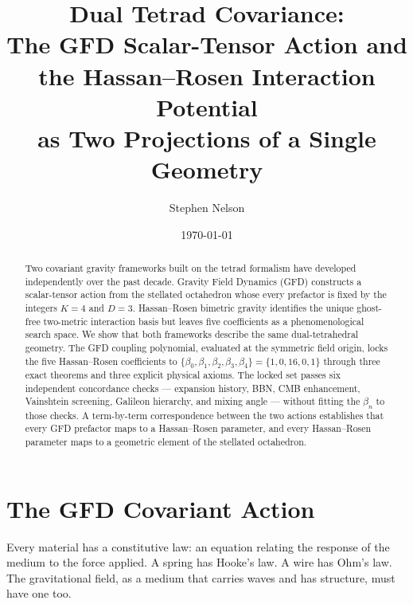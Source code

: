 \documentclass[twocolumn,showpacs,preprintnumbers,amsmath,amssymb,prd]{revtex4-2}
\begin{document}
\title{Dual Tetrad Covariance:\\The GFD Scalar-Tensor Action and the Hassan--Rosen Interaction Potential\\as Two Projections of a Single Geometry}

\author{Stephen Nelson}

\date{\today}

\begin{abstract}
Two covariant gravity frameworks built on the tetrad formalism have developed independently over the past decade. Gravity Field Dynamics (GFD) constructs a scalar-tensor action from the stellated octahedron whose every prefactor is fixed by the integers $K=4$ and $D=3$. Hassan--Rosen bimetric gravity identifies the unique ghost-free two-metric interaction basis but leaves five coefficients as a phenomenological search space. We show that both frameworks describe the same dual-tetrahedral geometry. The GFD coupling polynomial, evaluated at the symmetric field origin, locks the five Hassan--Rosen coefficients to $\{\beta_0, \beta_1, \beta_2, \beta_3, \beta_4\} = \{1, 0, 16, 0, 1\}$ through three exact theorems and three explicit physical axioms. The locked set passes six independent concordance checks --- expansion history, BBN, CMB enhancement, Vainshtein screening, Galileon hierarchy, and mixing angle --- without fitting the $\beta_n$ to those checks. A term-by-term correspondence between the two actions establishes that every GFD prefactor maps to a Hassan--Rosen parameter, and every Hassan--Rosen parameter maps to a geometric element of the stellated octahedron.
\end{abstract}

\maketitle


\section{The GFD Covariant Action}
\label{sec:gfd}

Every material has a constitutive law: an equation relating the response of the medium to the force applied. A spring has Hooke's law. A wire has Ohm's law. The gravitational field, as a medium that carries waves and has structure, must have one too.
\end{document}
